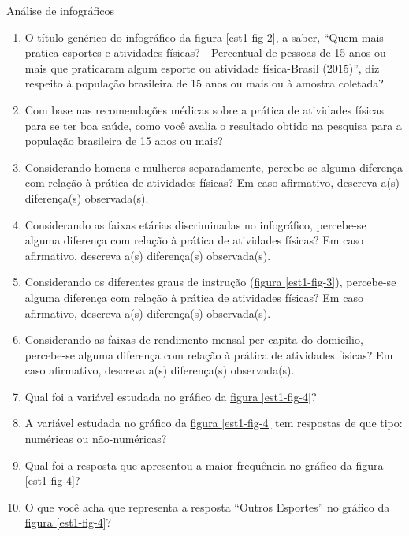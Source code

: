 \begin{task}{ Análise de infográficos}
\begin{enumerate}
\item {} 
O título genérico do infográfico da \hyperref[est1-fig-2]{figura \ref{est1-fig-2}}, a saber, “Quem mais pratica esportes e atividades físicas? - Percentual de pessoas de 15 anos ou mais que praticaram algum esporte ou atividade física-Brasil (2015)”, diz respeito à população brasileira de 15 anos ou mais ou à amostra coletada?

\item {} 
Com base nas recomendações médicas sobre a prática de atividades físicas para se ter boa saúde, como você avalia o resultado obtido na pesquisa para a população brasileira de 15 anos ou mais?

\item {} 
Considerando homens e mulheres separadamente, percebe-se alguma diferença com relação à prática de atividades físicas? Em caso afirmativo, descreva a(s) diferença(s) observada(s).

\item {} 
Considerando as faixas etárias discriminadas no infográfico, percebe-se alguma diferença com relação à prática de atividades físicas? Em caso afirmativo, descreva a(s) diferença(s) observada(s).

\item {} 
Considerando os diferentes graus de instrução (\hyperref[est1-fig-3]{figura \ref{est1-fig-3}}), percebe-se alguma diferença com relação à prática de atividades físicas? Em caso afirmativo, descreva a(s) diferença(s) observada(s).

\item {} 
Considerando as faixas de rendimento mensal per capita do domicílio, percebe-se alguma diferença com relação à prática de atividades físicas? Em caso afirmativo, descreva a(s) diferença(s) observada(s).

\item {} 
Qual foi a variável estudada no gráfico da \hyperref[est1-fig-4]{figura \ref{est1-fig-4}}?

\item {} 
A variável estudada no gráfico da \hyperref[est1-fig-4]{figura \ref{est1-fig-4}} tem respostas de que tipo: numéricas ou não-numéricas?

\item {} 
Qual foi a resposta que apresentou a maior frequência no gráfico da \hyperref[est1-fig-4]{figura \ref{est1-fig-4}}?

\item {} 
O que você acha que representa a resposta “Outros Esportes” no gráfico da \hyperref[est1-fig-4]{figura \ref{est1-fig-4}}?


\end{enumerate}
\end{task}
